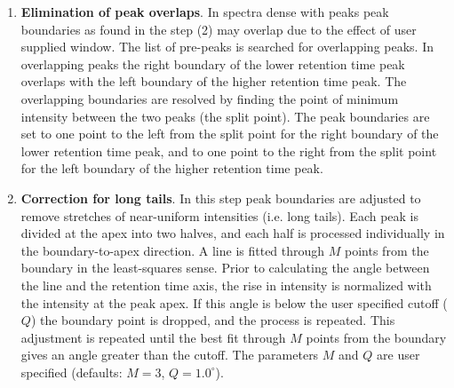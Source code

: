 \begin{enumerate}
\item {\bf Elimination of peak overlaps}. In spectra dense with
peaks peak boundaries as found in the step (2) may overlap due to
the effect of user supplied window. The list of pre-peaks is
searched for overlapping peaks. In overlapping peaks the right
boundary of the lower retention time peak overlaps with the
left boundary of the higher retention time peak. The overlapping
boundaries are resolved by finding the point of minimum intensity
between the two peaks (the split point). The peak boundaries are
set to one point to the left from the split point for the right
boundary of the lower retention time peak, and to one point to
the right from the split point for the left boundary of the
higher retention time peak.

\item {\bf Correction for long tails}.  In this step peak boundaries
are adjusted to remove stretches of near-uniform intensities
(i.e. long tails). Each peak is divided at the apex into two
halves, and each half is processed individually in the
boundary-to-apex direction. A line is fitted through $M$ points
from the boundary in the least-squares sense. Prior to calculating
the angle between the line and the retention time axis, the
rise in intensity is normalized with the intensity at the peak
apex.  If this angle is below the user specified cutoff ($Q$)
the boundary point is dropped, and the process is repeated.
This adjustment is repeated until the best fit through $M$ points
from the boundary gives an angle greater than the cutoff. The
parameters $M$ and $Q$ are user specified (defaults: $M = 3$,
$Q = 1.0^\circ$).

\end{enumerate}
